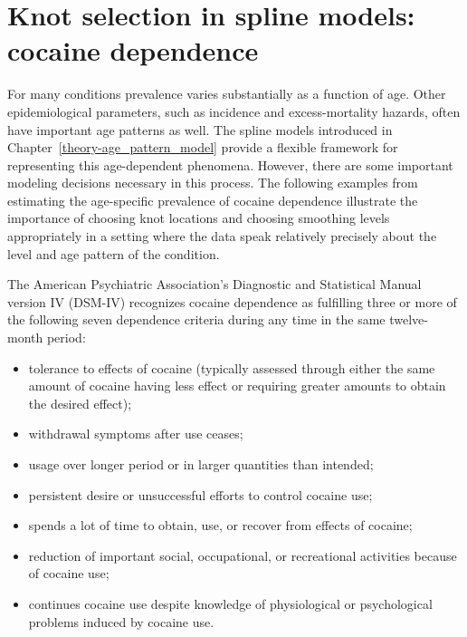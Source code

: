 \chapter{Knot selection in spline models: cocaine dependence}
\label{applications-splines_knot_loc}

For many conditions prevalence varies substantially as a function of
age.  Other epidemiological parameters, such as incidence and
excess-mortality hazards, often have important age patterns as well.
The spline models introduced in Chapter~\ref{theory-age_pattern_model}
provide a flexible framework for representing this age-dependent
phenomena.  However, there are some important modeling decisions
necessary in this process.  The following examples from estimating the
age-specific prevalence of cocaine dependence illustrate the
importance of choosing knot locations and choosing smoothing levels
appropriately in a setting where the data speak relatively precisely
about the level and age pattern of the condition.

The American Psychiatric Association's Diagnostic and Statistical Manual version IV 
(DSM-IV) recognizes cocaine dependence as fulfilling three or more of the
following seven dependence criteria during any time in the
same twelve-month period: \cite{american_psychiatric_association_diagnostic_2000, wagner_first_2002}
    \begin{itemize} \label{page:app-substance_dependence}
        \item tolerance to effects of cocaine (typically assessed through either the same amount of cocaine having less effect or requiring greater amounts to obtain the desired effect);
        \item withdrawal symptoms after use ceases;
        \item usage over longer period or in larger quantities than intended;
        \item persistent desire or unsuccessful efforts to control
          cocaine use;
        \item spends a lot of time to obtain, use, or recover
          from effects of cocaine;
        \item reduction of important social, occupational, or recreational
          activities because of cocaine use;
        \item continues cocaine use despite knowledge of
          physiological or psychological problems induced by cocaine
          use.
    \end{itemize}

